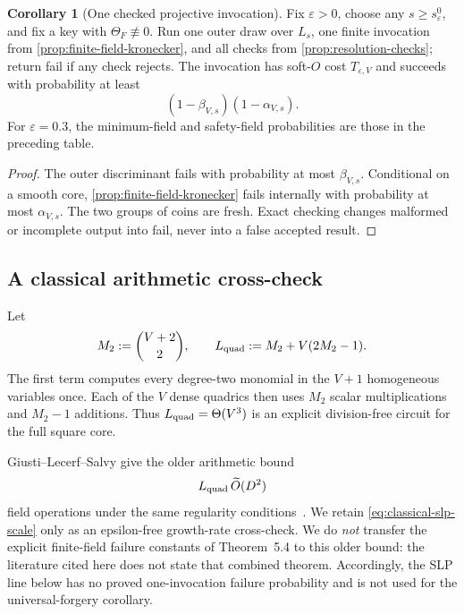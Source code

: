 \documentclass[11pt,a4paper]{article}
\theoremstyle{definition}
\newtheorem{corollary}[theorem]{Corollary}
\theoremstyle{remark}
\begin{document}
\begin{corollary}[One checked projective invocation]\label{cor:fast-single-invocation}
Fix $\varepsilon>0$, choose any $s\ge s_\varepsilon^0$, and fix a key with $\Theta_F\not\equiv0$.  Run one outer draw over $L_s$, one finite invocation from \cref{prop:finite-field-kronecker}, and all checks from \cref{prop:resolution-checks}; return \textsf{fail} if any check rejects.  The invocation has soft-$O$ cost $T_{\varepsilon,V}$ and succeeds with probability at least
\begin{equation}\label{eq:fast-single-invocation-success}
 (1-\beta_{V,s})(1-\alpha_{V,s}).
\end{equation}
For $\varepsilon=0.3$, the minimum-field and safety-field probabilities are those in the preceding table.
\end{corollary}

\begin{proof}
The outer discriminant fails with probability at most $\beta_{V,s}$.  Conditional on a smooth core, \cref{prop:finite-field-kronecker} fails internally with probability at most $\alpha_{V,s}$.  The two groups of coins are fresh.  Exact checking changes malformed or incomplete output into \textsf{fail}, never into a false accepted result.
\end{proof}

\subsection{A classical arithmetic cross-check}\label{subsec:slp-solver}

Let
\begin{equation}\label{eq:slp-length}
 M_2:=\binom{V+2}{2},
 \qquad
 L_{\rm quad}:=M_2+V(2M_2-1).
\end{equation}
The first term computes every degree-two monomial in the $V+1$ homogeneous variables once.  Each of the $V$ dense quadrics then uses $M_2$ scalar multiplications and $M_2-1$ additions.  Thus $L_{\rm quad}=\Theta(V^3)$ is an explicit division-free circuit for the full square core.

Giusti--Lecerf--Salvy give the older arithmetic bound
\begin{equation}\label{eq:classical-slp-scale}
 L_{\rm quad}\,\widetilde O(D^2)
\end{equation}
field operations under the same regularity conditions~\cite{GiustiLecerfSalvy2001,vdHL}.  We retain \eqref{eq:classical-slp-scale} only as an epsilon-free growth-rate cross-check.  We do \emph{not} transfer the explicit finite-field failure constants of Theorem~5.4 to this older bound: the literature cited here does not state that combined theorem.  Accordingly, the SLP line below has no proved one-invocation failure probability and is not used for the universal-forgery corollary.
\end{document}
